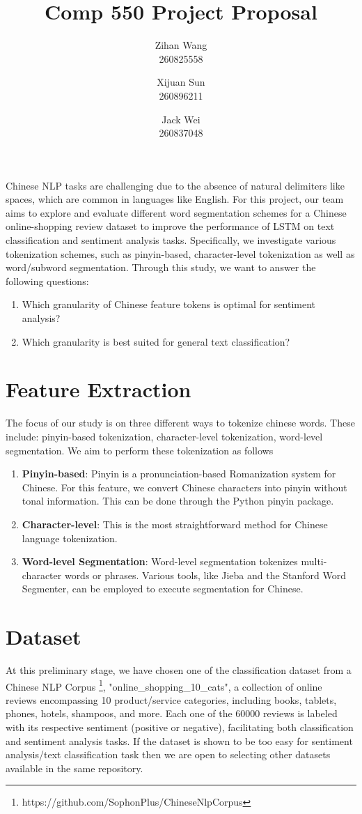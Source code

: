 \documentclass[9pt, a4paper]{extarticle}
\title{Comp 550 Project Proposal}
\author{Zihan Wang\\
260825558
\and Xijuan Sun \\
260896211
\and Jack Wei \\
260837048}
\date{}
\begin{document}
\maketitle

Chinese NLP tasks are challenging due to the absence of natural delimiters like spaces, which are common in languages like English. For this project, our team aims to explore and evaluate different word segmentation schemes for a Chinese online-shopping review dataset to improve the performance of LSTM on text classification and sentiment analysis tasks. Specifically, we investigate various tokenization schemes, such as pinyin-based, character-level tokenization as well as word/subword segmentation. Through this study, we want to answer the following questions: 

\begin{enumerate}
    \item Which granularity of Chinese feature tokens is optimal for sentiment analysis?
    \item Which granularity is best suited for general text classification?
\end{enumerate}

\section{Feature Extraction}
The focus of our study is on three different ways to tokenize chinese words. These include: pinyin-based tokenization, character-level tokenization, word-level segmentation. We aim to perform these tokenization as follows

\begin{enumerate}
    \item \textbf{Pinyin-based}: Pinyin is a pronunciation-based Romanization system for Chinese. For this feature, we convert Chinese characters into pinyin without tonal information. This can be done through the Python pinyin package. 
    \item \textbf{Character-level}: 
    This is the most straightforward method for Chinese language tokenization.
    \item \textbf{Word-level Segmentation}: Word-level segmentation tokenizes multi-character words or phrases. Various tools, like Jieba and the Stanford Word Segmenter, can be employed to execute segmentation for Chinese. 
\end{enumerate}

\section{Dataset}
At this preliminary stage, we have chosen one of the classification dataset from a Chinese NLP Corpus \footnote{https://github.com/SophonPlus/ChineseNlpCorpus}, "online\_shopping\_10\_cats", a collection of online reviews encompassing 10 product/service categories, including books, tablets, phones, hotels, shampoos, and more. Each one of the 60000 reviews is labeled with its respective sentiment (positive or negative), facilitating both classification and sentiment analysis tasks. If the dataset is shown to be too easy for sentiment analysis/text classification task then we are open to selecting other datasets available in the same repository. 
\end{document}
